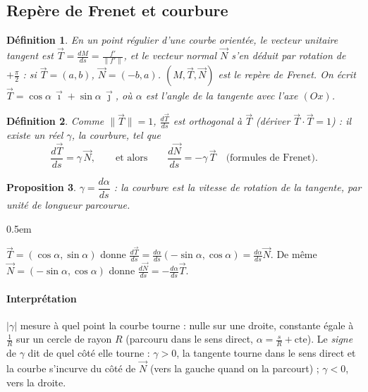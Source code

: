 \documentclass[a4paper,11pt]{article}
\makeatletter
\numberwithin{equation}{section}
\numberwithin{figure}{section}
\numberwithin{table}{section}
\theoremstyle{enonce}
\newtheorem{definition}{Définition}[section]
\newtheorem{proposition}[definition]{Proposition}
\theoremstyle{exemple}
\theoremstyle{remarque}
\renewcommand{\proofname}{Démonstration}
\renewenvironment{proof}[1][\proofname]{\par\pushQED{\qed}\normalfont
  \topsep0.5em\relax\trivlist\item[\hskip\labelsep\sffamily\itshape\color{Gris}#1.]\ignorespaces}
  {\popQED\endtrivlist\@endpefalse}
\newcommand{\ve}[1]{\vec{#1}}
\makeatother
\begin{document}
\subsection{Repère de Frenet et courbure}

\begin{definition}
En un point régulier d'une courbe orientée, le \emph{vecteur unitaire tangent} est $\ve T=\frac{dM}{ds}=\frac{f'}{\|f'\|}$, et le
\emph{vecteur normal} $\ve N$ s'en déduit par rotation de $+\frac\pi2$ : si $\ve T=(a,b)$, $\ve N=(-b,a)$. $(M,\ve T,\ve N)$ est le
\emph{repère de Frenet}. On écrit $\ve T=\cos\alpha\,\ve\imath+\sin\alpha\,\ve\jmath$, où $\alpha$ est l'angle de la tangente
avec l'axe $(Ox)$.
\end{definition}

\begin{definition}
Comme $\|\ve T\|=1$, $\frac{d\ve T}{ds}$ est orthogonal à $\ve T$ (dériver $\ve T\cdot\ve T=1$) : il existe un réel $\gamma$, la
\emph{courbure}, tel que
\[\frac{d\ve T}{ds}=\gamma\,\ve N,\qquad\text{et alors}\qquad\frac{d\ve N}{ds}=-\gamma\,\ve T\quad\text{(formules de Frenet)}.\]
\end{definition}

\begin{proposition}\label{prop:alpha}
$\gamma=\dfrac{d\alpha}{ds}$ : la courbure est la vitesse de rotation de la tangente, par unité de longueur parcourue.
\end{proposition}

\begin{proof}
$\ve T=(\cos\alpha,\sin\alpha)$ donne $\frac{d\ve T}{ds}=\frac{d\alpha}{ds}(-\sin\alpha,\cos\alpha)=\frac{d\alpha}{ds}\ve N$. De même
$\ve N=(-\sin\alpha,\cos\alpha)$ donne $\frac{d\ve N}{ds}=-\frac{d\alpha}{ds}\ve T$.
\end{proof}

\paragraph{Interprétation} $|\gamma|$ mesure à quel point la courbe tourne : nulle sur une droite, constante égale à
$\frac1R$ sur un cercle de rayon $R$ (parcouru dans le sens direct, $\alpha=\frac sR+\text{cte}$). Le \emph{signe} de $\gamma$
dit de quel côté elle tourne : $\gamma>0$, la tangente tourne dans le sens direct et la courbe s'incurve du côté de $\ve N$
(vers la gauche quand on la parcourt) ; $\gamma<0$, vers la droite.
\end{document}
